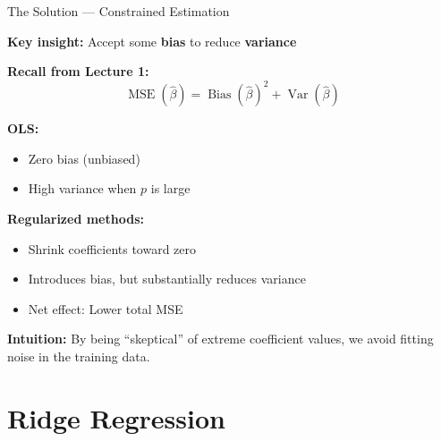 \documentclass[10pt]{beamer}
\newcommand{\highlight}[1]{\textcolor{AccentOrange}{\textbf{#1}}}
\DeclareMathOperator{\Var}{Var}
\DeclareMathOperator{\MSE}{MSE}
\DeclareMathOperator{\Bias}{Bias}
\begin{document}

\begin{frame}{The Solution --- Constrained Estimation}

\textbf{Key insight:} Accept some \highlight{bias} to reduce \highlight{variance}

\vspace{1em}
\textbf{Recall from Lecture 1:}
\[
\MSE(\widehat{\beta}) = \Bias(\widehat{\beta})^2 + \Var(\widehat{\beta})
\]

\vspace{0.5em}
\textbf{OLS:}
\begin{itemize}
  \item Zero bias (unbiased)
  \item High variance when $p$ is large
\end{itemize}

\vspace{0.5em}
\textbf{Regularized methods:}
\begin{itemize}
  \item Shrink coefficients toward zero
  \item Introduces bias, but substantially reduces variance
  \item Net effect: Lower total MSE
\end{itemize}

\vspace{1em}
\textbf{Intuition:} By being ``skeptical'' of extreme coefficient values, we avoid fitting noise in the training data.

\end{frame}

\section{Ridge Regression}
\end{document}

